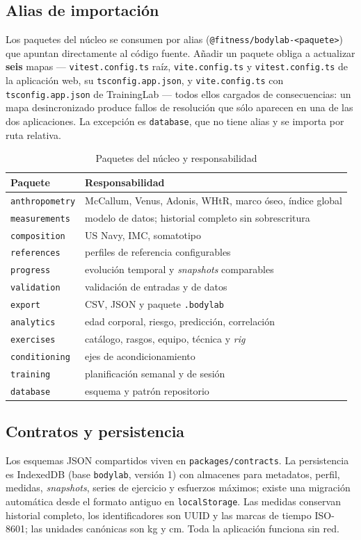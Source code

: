 \documentclass[conference]{IEEEtran}
\newcommand{\code}[1]{\texttt{\small #1}}
\begin{document}
\subsection{Alias de importaci\'on}
Los paquetes del n\'ucleo se consumen por alias
(\code{@fitness/bodylab-<paquete>}) que apuntan directamente al c\'odigo fuente.
A\~nadir un paquete obliga a actualizar \textbf{seis} mapas ---
\code{vitest.config.ts} ra\'iz, \code{vite.config.ts} y
\code{vitest.config.ts} de la aplicaci\'on web, su \code{tsconfig.app.json},
y \code{vite.config.ts} con \code{tsconfig.app.json} de TrainingLab --- todos
ellos cargados de consecuencias: un mapa desincronizado produce fallos de
resoluci\'on que s\'olo aparecen en una de las dos aplicaciones. La excepci\'on
es \code{database}, que no tiene alias y se importa por ruta relativa.

\begin{table}[t]
\caption{Paquetes del n\'ucleo y responsabilidad}
\label{tab:core}
\centering
\footnotesize
\begin{tabular}{@{}p{22mm}p{47mm}@{}}
\toprule
Paquete & Responsabilidad \\
\midrule
\code{anthropometry} & McCallum, Venus, Adonis, WHtR, marco \'oseo, \'indice global \\
\code{measurements} & modelo de datos; historial completo sin sobrescritura \\
\code{composition} & US Navy, IMC, somatotipo \\
\code{references} & perfiles de referencia configurables \\
\code{progress} & evoluci\'on temporal y \emph{snapshots} comparables \\
\code{validation} & validaci\'on de entradas y de datos \\
\code{export} & CSV, JSON y paquete \code{.bodylab} \\
\code{analytics} & edad corporal, riesgo, predicci\'on, correlaci\'on \\
\code{exercises} & cat\'alogo, rasgos, equipo, t\'ecnica y \emph{rig} \\
\code{conditioning} & ejes de acondicionamiento \\
\code{training} & planificaci\'on semanal y de sesi\'on \\
\code{database} & esquema y patr\'on repositorio \\
\bottomrule
\end{tabular}
\end{table}

\subsection{Contratos y persistencia}
Los esquemas JSON compartidos viven en \code{packages/contracts}. La persistencia
es IndexedDB (base \code{bodylab}, versi\'on 1) con almacenes para metadatos,
perfil, medidas, \emph{snapshots}, series de ejercicio y esfuerzos m\'aximos;
existe una migraci\'on autom\'atica desde el formato antiguo en
\code{localStorage}. Las medidas conservan historial completo, los
identificadores son UUID y las marcas de tiempo ISO-8601; las unidades can\'onicas
son kg y cm. Toda la aplicaci\'on funciona sin red.
\end{document}
